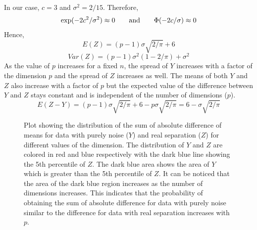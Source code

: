 In our case, $c = 3$ and $\sigma^2 = 2/15$. Therefore,
$$\exp(- 2c^2/\sigma^2) \approx 0 \qquad \hbox{and} \qquad \Phi(-2c/\sigma) \approx 0$$
Hence,
$$E(Z) = (p - 1) \sigma \sqrt{2/\pi} + 6$$
$$Var(Z) = (p - 1)\sigma^2 (1 - 2/\pi) + \sigma^2$$
As the value of $p$ increases for a fixed $n$, the spread of $Y$ increases with a factor of the dimension $p$ and the spread of $Z$ increases as well. The means of both $Y$ and $Z$ also increase with a factor of $p$ but the expected value of the difference between $Y$ and $Z$ stays constant and is independent of the number of dimensions ($p$). 
$$E (Z - Y) = (p - 1) \sigma \sqrt{2/\pi} + 6 - p \sigma \sqrt{2/\pi} = 6 - \sigma \sqrt{2/\pi}$$


%
\begin{figure}[hbtp]
   \centering
       \caption{Plot showing the distribution of the sum of absolute difference of means for data with purely noise ($Y$) and real separation ($Z$) for different values of the dimension. The distribution of $Y$ and $Z$ are colored in red and blue respectively with the dark blue line showing the 5th percentile of $Z$. The dark blue area shows the area of $Y$ which is greater than the 5th percentile of $Z$. It can be noticed that the area of the dark blue region  increases as the number of dimensions increases. This indicates that the probability of obtaining the sum of absolute difference for data with purely noise similar to the difference for data with real separation increases with $p$. }
     \label{fig:dimen}
\end{figure}

